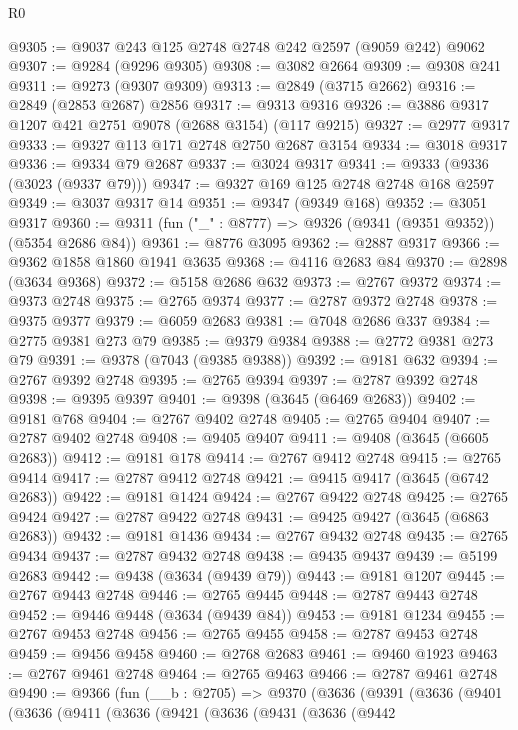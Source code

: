 \begin{lexlean}{R0}
\begin{coremodule}
@9305 := @9037 @243 @125 @2748 @2748 @242 @2597 (@9059 @242) @9062
@9307 := @9284 (@9296 @9305)
@9308 := @3082 @2664
@9309 := @9308 @241
@9311 := @9273 (@9307 @9309)
@9313 := @2849 (@3715 @2662)
@9316 := @2849 (@2853 @2687) @2856
@9317 := @9313 @9316
@9326 := @3886 @9317 @1207 @421 @2751 @9078 (@2688 @3154) (@117 @9215)
@9327 := @2977 @9317
@9333 := @9327 @113 @171 @2748 @2750 @2687 @3154
@9334 := @3018 @9317
@9336 := @9334 @79 @2687
@9337 := @3024 @9317
@9341 := @9333 (@9336 (@3023 (@9337 @79)))
@9347 := @9327 @169 @125 @2748 @2748 @168 @2597
@9349 := @3037 @9317 @14
@9351 := @9347 (@9349 @168)
@9352 := @3051 @9317
@9360 := @9311 (fun ("_" : @8777) => @9326 (@9341 (@9351 @9352)) (@5354 @2686 @84))
@9361 := @8776 @3095
@9362 := @2887 @9317
@9366 := @9362 @1858 @1860 @1941 @3635
@9368 := @4116 @2683 @84
@9370 := @2898 (@3634 @9368)
@9372 := @5158 @2686 @632
@9373 := @2767 @9372
@9374 := @9373 @2748
@9375 := @2765 @9374
@9377 := @2787 @9372 @2748
@9378 := @9375 @9377
@9379 := @6059 @2683
@9381 := @7048 @2686 @337
@9384 := @2775 @9381 @273 @79
@9385 := @9379 @9384
@9388 := @2772 @9381 @273 @79
@9391 := @9378 (@7043 (@9385 @9388))
@9392 := @9181 @632
@9394 := @2767 @9392 @2748
@9395 := @2765 @9394
@9397 := @2787 @9392 @2748
@9398 := @9395 @9397
@9401 := @9398 (@3645 (@6469 @2683))
@9402 := @9181 @768
@9404 := @2767 @9402 @2748
@9405 := @2765 @9404
@9407 := @2787 @9402 @2748
@9408 := @9405 @9407
@9411 := @9408 (@3645 (@6605 @2683))
@9412 := @9181 @178
@9414 := @2767 @9412 @2748
@9415 := @2765 @9414
@9417 := @2787 @9412 @2748
@9421 := @9415 @9417 (@3645 (@6742 @2683))
@9422 := @9181 @1424
@9424 := @2767 @9422 @2748
@9425 := @2765 @9424
@9427 := @2787 @9422 @2748
@9431 := @9425 @9427 (@3645 (@6863 @2683))
@9432 := @9181 @1436
@9434 := @2767 @9432 @2748
@9435 := @2765 @9434
@9437 := @2787 @9432 @2748
@9438 := @9435 @9437
@9439 := @5199 @2683
@9442 := @9438 (@3634 (@9439 @79))
@9443 := @9181 @1207
@9445 := @2767 @9443 @2748
@9446 := @2765 @9445
@9448 := @2787 @9443 @2748
@9452 := @9446 @9448 (@3634 (@9439 @84))
@9453 := @9181 @1234
@9455 := @2767 @9453 @2748
@9456 := @2765 @9455
@9458 := @2787 @9453 @2748
@9459 := @9456 @9458
@9460 := @2768 @2683
@9461 := @9460 @1923
@9463 := @2767 @9461 @2748
@9464 := @2765 @9463
@9466 := @2787 @9461 @2748
@9490 := @9366
    (fun (__b : @2705) =>
    @9370
      (@3636
        (@9391
          (@3636
            (@9401
              (@3636
                (@9411
                  (@3636
                    (@9421
                      (@3636
                        (@9431
                          (@3636
                            (@9442

\end{coremodule}
\end{lexlean}
